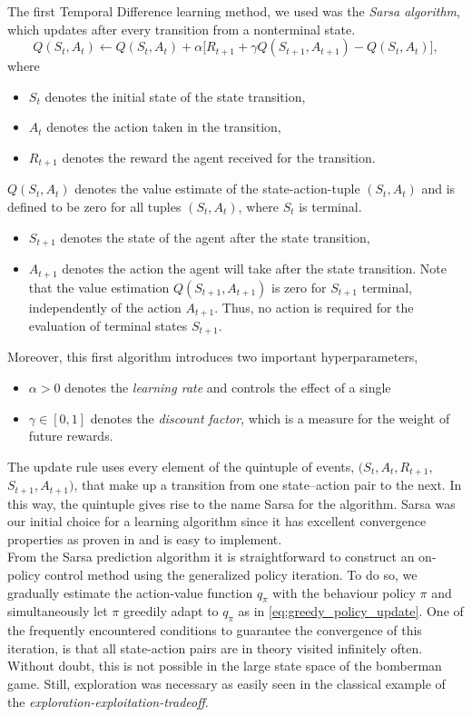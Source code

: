 The first Temporal Difference learning method, we used was the \emph{Sarsa algorithm}, which updates after every transition from a nonterminal state.  \\
\begin{equation} \label{eq:sarsa_update}
	Q(S_t, A_t) \leftarrow Q(S_t, A_t) + \alpha \big[R_{t+1} + \gamma Q(S_{t+1}, A_{t+1}) - Q(S_t, A_t)\big],
\end{equation}
where
\begin{itemize}
	\item $S_t$ denotes the initial state of the state transition,
	\item $A_t$ denotes the action taken in the transition,
	\item $R_{t+1}$ denotes the reward the agent received for the transition.
\end{itemize}
$Q(S_t, A_t)$ denotes the value estimate of the state-action-tuple $(S_t, A_t)$ and is defined to be zero for all tuples $(S_t, A_t)$, where $S_t$ is terminal.
\begin{itemize}
	\item $S_{t+1}$ denotes the state of the agent after the state transition,
	\item $A_{t+1}$ denotes the action the agent will take after the state transition. Note that the value estimation $Q(S_{t+1}, A_{t+1})$ is zero for $S_{t+1}$ terminal, independently of the action $A_{t+1}$. Thus, no action is required for the evaluation of terminal states $S_{t+1}$. 
\end{itemize}
Moreover, this first algorithm introduces two important hyperparameters,
\begin{itemize}
	\item $\alpha > 0$ denotes the \emph{learning rate} and controls the effect of a single 
	\item $\gamma \in [0, 1]$ denotes the \emph{discount factor}, which is a measure for the weight of future rewards. 
\end{itemize}

The update rule uses every element of the quintuple of events, $(S_t, A_t, R_{t+1}$, $S_{t+1}, A_{t+1})$, that make up a transition from one state–action pair to the next. In this way, the quintuple gives rise to the name Sarsa for the algorithm. Sarsa was our initial choice for a learning algorithm since it has excellent convergence properties as proven in \cite{Singh2000} and is easy to implement. \\

From the Sarsa prediction algorithm it is straightforward to construct an on-policy control method using the generalized policy iteration. To do so, we gradually estimate the action-value function $q_\pi$ with the behaviour policy $\pi$ and simultaneously let $\pi$ greedily adapt to $q_\pi$ as in \eqref{eq:greedy_policy_update}. One of the frequently encountered conditions to guarantee the convergence of this iteration, is that all state-action pairs are in theory visited infinitely often. Without doubt, this is not possible in the large state space of the bomberman game. Still, exploration was necessary as easily seen in the classical example of the \emph{exploration-exploitation-tradeoff}. 

